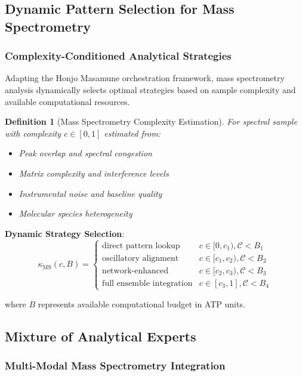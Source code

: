 \documentclass[11pt,a4paper]{article}
\newtheorem{definition}[theorem]{Definition}
\theoremstyle{remark}
\begin{document}
\subsection{Dynamic Pattern Selection for Mass Spectrometry}

\subsubsection{Complexity-Conditioned Analytical Strategies}

Adapting the Honjo Masamune orchestration framework, mass spectrometry analysis dynamically selects optimal strategies based on sample complexity and available computational resources.

\begin{definition}[Mass Spectrometry Complexity Estimation]
For spectral sample with complexity $c \in [0,1]$ estimated from:
\begin{itemize}
\item Peak overlap and spectral congestion
\item Matrix complexity and interference levels  
\item Instrumental noise and baseline quality
\item Molecular species heterogeneity
\end{itemize}
\end{definition}

\textbf{Dynamic Strategy Selection}:
\begin{equation}
\kappa_{\text{MS}}(c, B) = \begin{cases}
\text{direct pattern lookup} & c \in [0, c_1), \mathcal{C} < B_1\\
\text{oscillatory alignment} & c \in [c_1, c_2), \mathcal{C} < B_2\\
\text{network-enhanced} & c \in [c_2, c_3), \mathcal{C} < B_3\\
\text{full ensemble integration} & c \in [c_3, 1], \mathcal{C} < B_4
\end{cases}
\end{equation}

where $B$ represents available computational budget in ATP units.

\subsection{Mixture of Analytical Experts}

\subsubsection{Multi-Modal Mass Spectrometry Integration}
\end{document}
